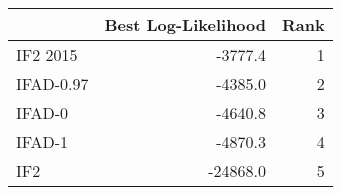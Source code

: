 \begin{tabular}{lrr}
\toprule
 & Best Log-Likelihood & Rank \\
\midrule
IF2 2015 & -3777.4 & 1 \\
IFAD-0.97 & -4385.0 & 2 \\
IFAD-0 & -4640.8 & 3 \\
IFAD-1 & -4870.3 & 4 \\
IF2 & -24868.0 & 5 \\
\bottomrule
\end{tabular}
